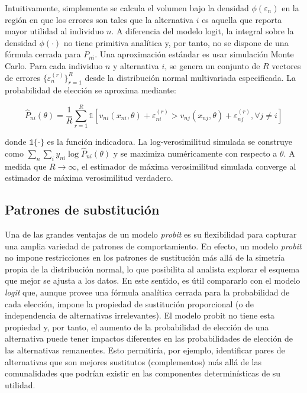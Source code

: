 \documentclass[
]{book}
\begin{document}
Intuitivamente, simplemente se calcula el volumen bajo la densidad \(\phi(\varepsilon_n)\) en la región en que los errores son tales que la alternativa \(i\) es aquella que reporta mayor utilidad al individuo \(n\). A diferencia del modelo logit, la integral sobre la densidad \(\phi(\cdot)\) no tiene primitiva analítica y, por tanto, no se dispone de una fórmula cerrada para \(P_{ni}\). Una aproximación estándar es usar simulación Monte Carlo. Para cada individuo \(n\) y alternativa \(i\), se genera un conjunto de \(R\) vectores de errores \(\{\varepsilon_n^{(r)}\}_{r=1}^R\) desde la distribución normal multivariada especificada. La probabilidad de elección se aproxima mediante:

\begin{equation}
\hat{P}_{ni}(\theta) = \frac{1}{R}\sum_{r=1}^R \mathbb{1}\left[v_{ni}(x_{ni},\theta) + \varepsilon_{ni}^{(r)} > v_{nj}(x_{nj},\theta) + \varepsilon_{nj}^{(r)}, \forall j \neq i\right]
\label{eq:simprob}
\end{equation}

donde \(\mathbb{1}\{\cdot\}\) es la función indicadora. La log-verosimilitud simulada se construye como \(\sum_n\sum_i y_{ni}\log\hat{P}_{ni}(\theta)\) y se maximiza numéricamente con respecto a \(\theta\). A medida que \(R \to \infty\), el estimador de máxima verosimilitud simulada converge al estimador de máxima verosimilitud verdadero.

\hypertarget{patrones-de-substituciuxf3n}{%
\subsection{Patrones de substitución}\label{patrones-de-substituciuxf3n}}

Una de las grandes ventajas de un modelo \emph{probit} es su flexibilidad para capturar una amplia variedad de patrones de comportamiento. En efecto, un modelo \emph{probit} no impone restricciones en los patrones de sustitución más allá de la simetría propia de la distribución normal, lo que posibilita al analista explorar el esquema que mejor se ajusta a los datos. En este sentido, es útil compararlo con el modelo \emph{logit} que, aunque provee una fórmula analítica cerrada para la probabilidad de cada elección, impone la propiedad de sustitución proporcional (o de independencia de alternativas irrelevantes). El modelo probit no tiene esta propiedad y, por tanto, el aumento de la probabilidad de elección de una alternativa puede tener impactos diferentes en las probabilidades de elección de las alternativas remanentes. Esto permitiría, por ejemplo, identificar pares de alternativas que son mejores sustitutos (complementos) más allá de las comunalidades que podrían existir en las componentes determinísticas de su utilidad.
\end{document}
